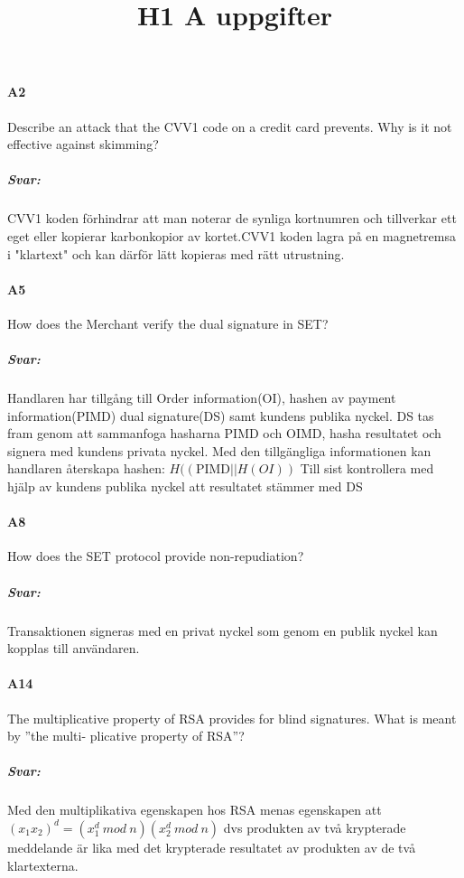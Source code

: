 \documentclass[a4paper]{article}
\title{H1 A uppgifter}
\date{}
\begin{document}
\maketitle
\paragraph{A2}
Describe an attack that the CVV1 code on a credit card prevents. Why is it not effective against
skimming?
\subparagraph{Svar:} CVV1 koden förhindrar att man noterar de synliga kortnumren och tillverkar ett eget eller kopierar karbonkopior av kortet.CVV1 koden lagra på en magnetremsa i "klartext" och kan därför lätt kopieras med rätt utrustning.

\paragraph{A5} 
How does the Merchant verify the dual signature in SET?
\subparagraph{Svar:} Handlaren har tillgång till Order information(OI), hashen av payment information(PIMD) dual signature(DS) samt kundens publika nyckel. DS tas fram genom att sammanfoga hasharna PIMD  och OIMD, hasha resultatet och signera med kundens privata nyckel.
Med den tillgängliga informationen kan handlaren återskapa hashen: $H((\text{PIMD}||H(OI))$
Till sist kontrollera med hjälp av kundens publika nyckel att resultatet stämmer med DS 

\paragraph{A8} 
How does the SET protocol provide non-repudiation?
\subparagraph{Svar:} Transaktionen signeras med en privat nyckel som genom en publik nyckel kan kopplas till användaren.

\paragraph{A14} 
The multiplicative property of RSA provides for blind signatures. What is meant by ”the multi-
plicative property of RSA”?
\subparagraph{Svar:}
Med den multiplikativa egenskapen hos RSA menas egenskapen att $(x_1 x_2)^d = (x_1^d\ mod \ n)(x_2^d\ mod \ n) $ dvs produkten av två krypterade meddelande är lika med det krypterade resultatet av produkten av de två klartexterna.
\end{document}

